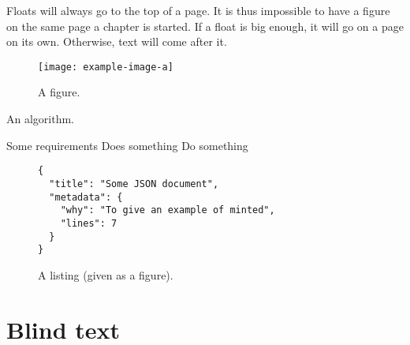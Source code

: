 \documentclass[
  b5paper,
  fontsize = 11pt,
  english,
  openany,
  twoside=false,
  roman equations,
]{thesis}
\begin{document}
  Floats will always go to the top of a page.
  It is thus impossible to have a figure on the same page a chapter is started.
  If a float is big enough, it will go on a page on its own.
  Otherwise, text will come after it.

  \begin{figure}
    \texttt{[image: example-image-a]}
    \caption{A figure.}
  \end{figure}

  \begin{algorithm}
    \caption{An algorithm.}
    \begin{algorithmic}[1]
      \Require Some requirements
      \Ensure Does something
      \Statex
        \State Do something
      \EndWhile
      \State {}
    \end{algorithmic}
  \end{algorithm}

  \begin{figure}
    \begin{verbatim}
{
  "title": "Some JSON document",
  "metadata": {
    "why": "To give an example of minted",
    "lines": 7
  }
}
    \end{verbatim}
    \caption{A listing (given as a figure).}
  \end{figure}

  \part{Blind text}

  \Blinddocument

  \backmatter

  \Blinddocument

  \printbibliography

  \printindex\label{index}

  \glsaddall[types={notations}]
  \printglossary[
    type=notations,
    style=long-symbol,
    nonumberlist,
  ]
\end{document}
